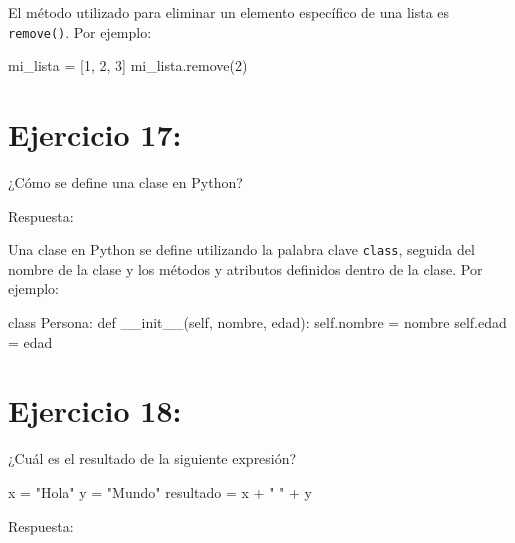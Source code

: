 \documentclass[
  a4paper,
  DIV=11,
  numbers=noendperiod,
  onepage,
  openany]{scrreprt}
\newenvironment{Shaded}{\begin{snugshade}}{\end{snugshade}}
\newcommand{\DecValTok}[1]{\textcolor[rgb]{0.68,0.00,0.00}{#1}}
\newcommand{\FunctionTok}[1]{\textcolor[rgb]{0.28,0.35,0.67}{#1}}
\newcommand{\KeywordTok}[1]{\textcolor[rgb]{0.00,0.23,0.31}{#1}}
\newcommand{\NormalTok}[1]{\textcolor[rgb]{0.00,0.23,0.31}{#1}}
\newcommand{\OperatorTok}[1]{\textcolor[rgb]{0.37,0.37,0.37}{#1}}
\newcommand{\StringTok}[1]{\textcolor[rgb]{0.13,0.47,0.30}{#1}}
\newcommand{\VariableTok}[1]{\textcolor[rgb]{0.07,0.07,0.07}{#1}}
\begin{document}
El método utilizado para eliminar un elemento específico de una lista es
\texttt{remove()}. Por ejemplo:

\begin{Shaded}
\begin{Highlighting}[]
\NormalTok{mi\_lista }\OperatorTok{=}\NormalTok{ [}\DecValTok{1}\NormalTok{, }\DecValTok{2}\NormalTok{, }\DecValTok{3}\NormalTok{]}
\NormalTok{mi\_lista.remove(}\DecValTok{2}\NormalTok{)}
\end{Highlighting}
\end{Shaded}

\chapter{Ejercicio 17:}\label{ejercicio-17}

¿Cómo se define una clase en Python?

Respuesta:

Una clase en Python se define utilizando la palabra clave
\texttt{class}, seguida del nombre de la clase y los métodos y atributos
definidos dentro de la clase. Por ejemplo:

\begin{Shaded}
\begin{Highlighting}[]
\KeywordTok{class}\NormalTok{ Persona:}
    \KeywordTok{def} \FunctionTok{\_\_init\_\_}\NormalTok{(}\VariableTok{self}\NormalTok{, nombre, edad):}
        \VariableTok{self}\NormalTok{.nombre }\OperatorTok{=}\NormalTok{ nombre}
        \VariableTok{self}\NormalTok{.edad }\OperatorTok{=}\NormalTok{ edad}
\end{Highlighting}
\end{Shaded}

\chapter{Ejercicio 18:}\label{ejercicio-18}

¿Cuál es el resultado de la siguiente expresión?

\begin{Shaded}
\begin{Highlighting}[]
\NormalTok{x }\OperatorTok{=} \StringTok{"Hola"}
\NormalTok{y }\OperatorTok{=} \StringTok{"Mundo"}
\NormalTok{resultado }\OperatorTok{=}\NormalTok{ x }\OperatorTok{+} \StringTok{" "} \OperatorTok{+}\NormalTok{ y}
\end{Highlighting}
\end{Shaded}

Respuesta:
\end{document}
